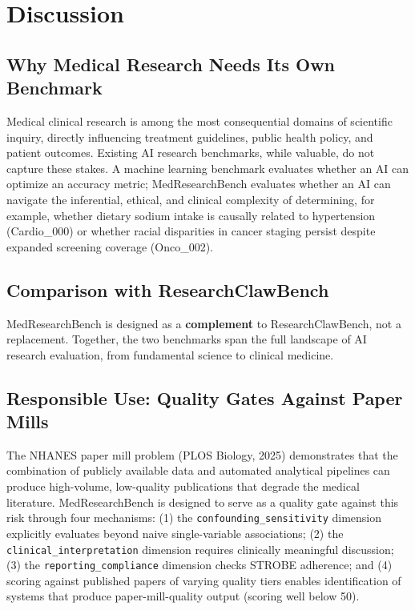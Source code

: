 \documentclass[12pt]{article}
\begin{document}
\section{Discussion}

\subsection{Why Medical Research Needs Its Own Benchmark}

Medical clinical research is among the most consequential domains of scientific inquiry, directly influencing treatment guidelines, public health policy, and patient outcomes. Existing AI research benchmarks, while valuable, do not capture these stakes. A machine learning benchmark evaluates whether an AI can optimize an accuracy metric; MedResearchBench evaluates whether an AI can navigate the inferential, ethical, and clinical complexity of determining, for example, whether dietary sodium intake is causally related to hypertension (Cardio\_000) or whether racial disparities in cancer staging persist despite expanded screening coverage (Onco\_002).

\subsection{Comparison with ResearchClawBench}

MedResearchBench is designed as a \textbf{complement} to ResearchClawBench, not a replacement. Together, the two benchmarks span the full landscape of AI research evaluation, from fundamental science to clinical medicine.

\subsection{Responsible Use: Quality Gates Against Paper Mills}

The NHANES paper mill problem (PLOS Biology, 2025) demonstrates that the combination of publicly available data and automated analytical pipelines can produce high-volume, low-quality publications that degrade the medical literature. MedResearchBench is designed to serve as a quality gate against this risk through four mechanisms: (1) the \texttt{confounding\_sensitivity} dimension explicitly evaluates beyond naive single-variable associations; (2) the \texttt{clinical\_interpretation} dimension requires clinically meaningful discussion; (3) the \texttt{reporting\_compliance} dimension checks STROBE adherence; and (4) scoring against published papers of varying quality tiers enables identification of systems that produce paper-mill-quality output (scoring well below 50).
\end{document}
